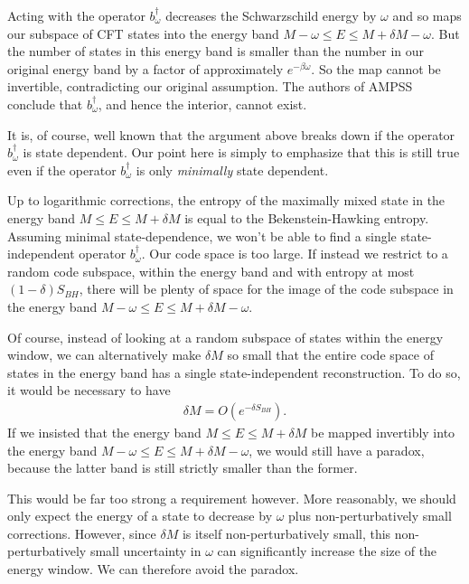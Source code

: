 \documentclass[11pt,a4paper]{article}
\begin{document}
Acting with the operator $b_\omega^\dagger$ decreases the Schwarzschild energy by $\omega$ and so maps our subspace of CFT states into the energy band $M - \omega \leq E \leq M + \delta M - \omega$. But the number of states in this energy band is smaller than the number in our original energy band by a factor of approximately $e^{-\beta \omega}$. So the map cannot be invertible, contradicting our original assumption. The authors of AMPSS conclude that $b_\omega^\dagger$, and hence the interior, cannot exist.

It is, of course, well known that the argument above breaks down if the operator $b_\omega^\dagger$ is state dependent. Our point here is simply to emphasize that this is still true even if the operator $b_\omega^\dagger$ is only \emph{minimally} state dependent. 

Up to logarithmic corrections, the entropy of the maximally mixed state in the energy band $M \leq E \leq M + \delta M$ is equal to the Bekenstein-Hawking entropy. Assuming minimal state-dependence, we won't be able to find a single state-independent operator $b_\omega^\dagger$. Our code space is too large. If instead we restrict to a random code subspace, within the energy band and with entropy at most $(1-\delta)S_{BH}$, there will be plenty of space for the image of the code subspace in the energy band $M - \omega \leq E \leq M + \delta M - \omega$.

Of course, instead of looking at a random subspace of states within the energy window, we can alternatively make $\delta M$ so small that the entire code space of states in the energy band has a single state-independent reconstruction. To do so, it would be necessary to have 
\begin{align}
\delta M = O(e^{-\delta S_{BH}}).
\end{align}
If we insisted that the energy band $M \leq E \leq M + \delta M$ be mapped invertibly into the energy band $M - \omega \leq E \leq M + \delta M - \omega$, we would still have a paradox, because the latter band is still strictly smaller than the former. 

This would be far too strong a requirement however. More reasonably, we should only expect the energy of a state to decrease by $\omega$ plus non-perturbatively small corrections. However, since $\delta M$ is itself non-perturbatively small, this non-perturbatively small uncertainty in $\omega$ can significantly increase the size of the energy window. We can therefore avoid the paradox.
\end{document}
